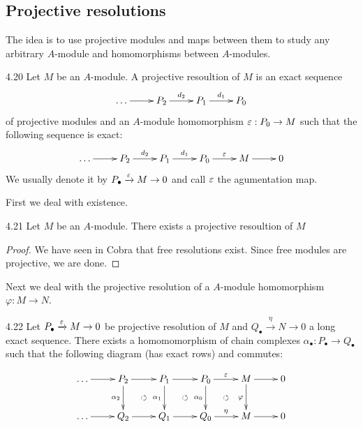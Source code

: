 \documentclass[twoside = false,	%
		headsepline,		%
		parskip = true,
		]{scrbook}						%
\begin{document}
\subsection{Projective resolutions}
    The idea is to use projective modules and maps between them to study any arbitrary $A$-module and homomorphisms  between $A$-modules.

    \begin{definition}{}{4.20}
        Let $M$ be an $A$-module. A projective resoultion of $M$ is an exact sequence
        \begin{equation*}
            \xymatrix{
                \dots \ar[r] & P_2 \ar[r]^{d_2} & P_1 \ar[r]^{d_1} & P_0 
            }
        \end{equation*}
        of projective modules and an $A$-module homomorphism $\varepsilon: P_0 \to M$ such that the following sequence is exact:
        \begin{equation*}
        \xymatrix {
            \dots \ar[r] & P_2 \ar[r]^{d_2} & P_1 \ar[r]^{d_1} & P_0 \ar[r]^{\e} & M \ar[r] & 0
        }
        \end{equation*}
        We usually denote it by $P_\bullet \xrightarrow{\varepsilon} M \to 0$ and call $\varepsilon$ the agumentation map.
    \end{definition}

    First we deal with existence.

    \begin{lemma}{}{4.21}
        Let $M$ be an $A$-module. There exists a projective resoultion of $M$
    \end{lemma}

    \begin{proof}
        We have seen in Cobra \cite{Cobra} that free resolutions exist. Since free modules are projective, we are done.
    \end{proof}

    Next we deal with the projective resolution of a $A$-module homomorphism $\varphi: M \to N$.

    \begin{proposition}{}{4.22}
        Let $P_\bullet \xrightarrow{\varepsilon} M \to 0$ be projective resolution of $M$ and $Q_\bullet \xrightarrow{\eta} N \to 0$ a long exact sequence. There exists a homomomorphism of chain complexes $\alpha_\bullet: P_\bullet \to Q_\bullet$ such that the following diagram (has exact rows) and commutes:

        \begin{equation*}
            \xymatrix {
                \dots \ar[r] & P_2 \ar[r] \ar[d]_{\alpha_2} & P_1 \ar[r] \ar[d]_{\alpha_1} & P_0 \ar[r]^{\e} \ar[d]_{\alpha_0}& M \ar[r] \ar[d]_{\varphi} & 0 \\
                \dots \ar[r] & Q_2 \ar[r] \ar@{}[ur]|{\circlearrowleft} & Q_1 \ar[r] \ar@{}[ur]|{\circlearrowleft} & Q_0 \ar[r]^{\eta} \ar@{}[ur]|{\circlearrowleft} & M \ar[r] & 0
            }
        \end{equation*}
    \end{proposition}
\end{document}
